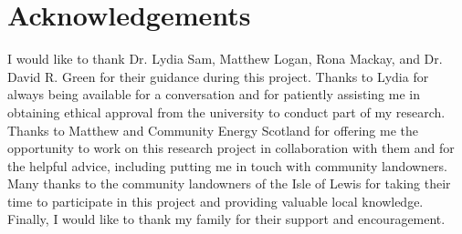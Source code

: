 \chapter{Acknowledgements}

I would like to thank Dr. Lydia Sam, Matthew Logan, Rona Mackay, and Dr. David R. Green for their guidance during this project. Thanks to Lydia for always being available for a conversation and for patiently assisting me in obtaining ethical approval from the university to conduct part of my research. Thanks to Matthew and Community Energy Scotland for offering me the opportunity to work on this research project in collaboration with them and for the helpful advice, including putting me in touch with community landowners. Many thanks to the community landowners of the Isle of Lewis for taking their time to participate in this project and providing valuable local knowledge. Finally, I would like to thank my family for their support and encouragement.
